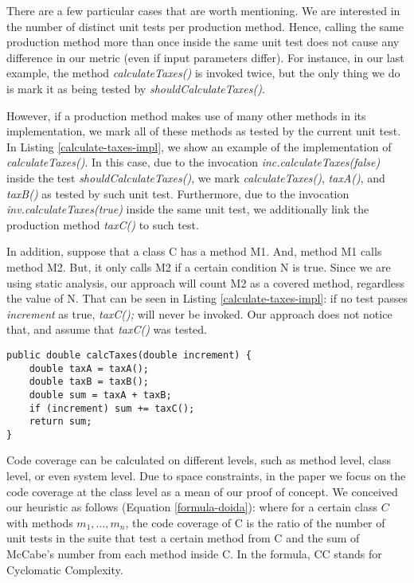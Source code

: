 \documentclass{sig-alternate}
\begin{document}
There are a few particular cases that are worth mentioning. We are interested in the number 
of distinct unit tests per production method. Hence, calling the same production method
more than once inside the same unit test does not cause any difference in our metric 
(even if input parameters differ). For instance, in our last example, the 
method \textit{calculateTaxes()} is invoked twice, but the only thing we do is mark it 
as being tested by \textit{shouldCalculateTaxes()}.

However, if a production method makes use of many other methods in its implementation,
we mark all of these methods as tested by the current unit test. In Listing \ref{calculate-taxes-impl},
we show an example of the implementation of \textit{calculateTaxes()}. In this case, due to the 
invocation \textit{inc.calculateTaxes(false)} inside the test \textit{shouldCalculateTaxes()}, 
we mark \textit{calculateTaxes()}, \textit{taxA()}, and \textit{taxB()} as tested 
by such unit test. Furthermore, due to the invocation \textit{inv.calculateTaxes(true)} inside
the same unit test, we additionally link the production method \textit{taxC()} to such test.

In addition, suppose that a class C has a method M1. And, method M1 calls method M2. But, it only calls M2 
if a certain condition N is true. 
Since we are using static analysis, our approach will count M2 as a covered method, regardless the value of N. 
That can be seen in Listing \ref{calculate-taxes-impl}: if no test passes \textit{increment} as true,
\textit{taxC();} will never be invoked. Our approach does not notice that, 
and assume that \textit{taxC()} was tested.

\begin{lstlisting}
public double calcTaxes(double increment) {
	double taxA = taxA();
	double taxB = taxB();
	double sum = taxA + taxB;
	if (increment) sum += taxC();
	return sum;
}
\end{lstlisting}

Code coverage can be calculated on different levels, such as method level, class level, or even
system level. Due to space constraints, in the paper we focus on the code coverage at the class level as
a mean of our proof of concept.
We conceived our heuristic as follows (Equation \ref{formula-doida}): 
where for a certain class $C$ with methods $m_1, ..., m_n$, 
the code coverage of C is the ratio of the number of unit tests in the suite that test a certain method from C and 
the sum of McCabe's number from each method inside C. In the formula, CC stands for Cyclomatic Complexity.
\end{document}
